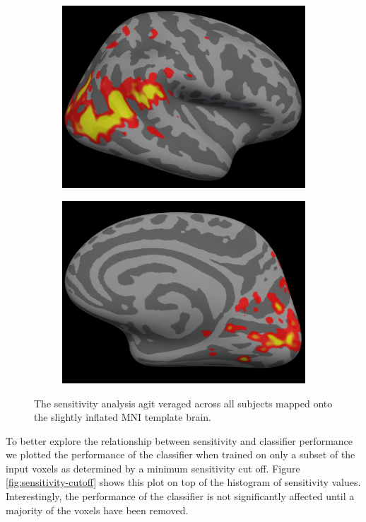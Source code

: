 \documentclass[preprint,5p,authoryear]{elsarticle}
\begin{document}
\begin{table}
\begin{figure}
\begin{subfigure}{0.4\textwidth}
\includegraphics[width=\textwidth]{figures/rh-lateral-smax-average}
\caption{}
\label{fig:rh-lateral-smax-average}
\end{subfigure}
\begin{subfigure}{0.4\textwidth}
\centering
\includegraphics[width=\textwidth]{figures/rh-medial-smax-average}
\caption{}
\label{fig:rh-medial-smax-average}
\end{subfigure}
\caption{The sensitivity analysis agit veraged across all subjects mapped onto the slightly inflated MNI template brain.}
\label{fig:MNI-average-sensitivity}
\end{figure}

To better explore the relationship between sensitivity and classifier performance we plotted the performance of the classifier when trained on only a subset of the input voxels as determined by a minimum sensitivity cut off.
Figure \ref{fig:sensitivity-cutoff} shows this plot on top of the histogram of sensitivity values.
Interestingly, the performance of the classifier is not significantly affected until a majority of the voxels have been removed.



\end{table}
\end{document}
